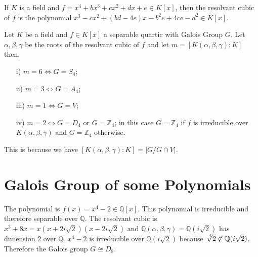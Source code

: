\begin{remark} \cite{hunger} If \(K\) is a field and \(f = x^4+bx^3+cx^2+dx+e \in K[x]\), then the resolvant cubic of \(f\) is the polynomial \(x^3-cx^2+(bd-4e)x-b^2e+4ce-d^2 \in K[x]\).
\end{remark}

\begin{tcolorbox}[boxsep=-1mm]
\begin{theorem} \cite{hunger}
  Let \(K\) be a field and \(f \in K[x]\) a separable quartic with Galois Group \(G\). Let \(\alpha, \beta, \gamma\) be the roots of the resolvant cubic of \(f\) and let \(m= [K(\alpha, \beta, \gamma) : K]\) then,
\begin{enumerate}
\item[i)] \(m=6 \Longleftrightarrow G=S_4\);
\item[ii)] \(m=3 \Longleftrightarrow G=A_4\);
\item[iii)] \(m=1 \Longleftrightarrow G=V\);
\item[iv)] \(m=2 \Longleftrightarrow G=D_4\) or \(G={\mathbb{Z}}_4\); in this case \(G={\mathbb{Z}}_4\) if \(f\) is irreducible over \(K(\alpha, \beta, \gamma)\) and \(G={\mathbb{Z}}_4\) otherwise.
\end{enumerate}
\end{theorem}
\end{tcolorbox}
This is because we have \([K(\alpha,\beta,\gamma):K] = |G/G \cap V|\).

\section{Galois Group of some Polynomials}
\begin{example} \cite{hunger}
The polynomial is \(f(x)=x^4-2 \in \mathbb{Q}[x]\). This polynomial is irreducible and therefore separable over \(\mathbb{Q}\). The resolvant cubic is \(x^3+8x = x(x+2i\sqrt{2})(x-2i\sqrt{2})\) and \(\mathbb{Q}(\alpha,\beta, \gamma)=\mathbb{Q}(i\sqrt{2})\) has dimension \(2\) over \(\mathbb{Q}\). \(x^4-2\) is irreducible over \(\mathbb{Q}(i\sqrt{2})\) because \(\sqrt[\leftroot{-3}\uproot{3}4]{2} \not\in \mathbb{Q}(i\sqrt{2})\). Therefore the Galois group \(G \cong D_8\).
\end{example}

